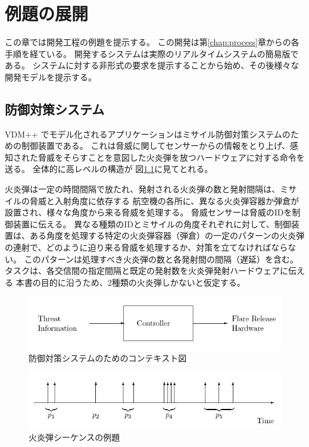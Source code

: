 \documentclass[\pformat,12pt]{jreport}
\begin{document}
\chapter{例題の展開}\label{chap:example}

この章では開発工程の例題を提示する。
この開発は第\ref{chap:process}章からの各手順を経ている。
開発するシステムは実際のリアルタイムシステムの簡易版である。
システムに対する非形式の要求を提示することから始め、その後様々な開発モデルを提示する。

\section{防御対策システム}\label{sec:CMdesc}

 VDM++ でモデル化されるアプリケーションはミサイル防御対策システムのための制御装置である。
これは脅威に関してセンサーからの情報をとり上げ、感知された脅威をそらすことを意図した火炎弾を放つハードウェアに対する命令を送る。
全体的に高レベルの構造が 図\ref{fig:contextdiag}に見てとれる。

火炎弾は一定の時間間隔で放たれ、発射される火炎弾の数と発射間隔は、ミサイルの脅威と入射角度に依存する
航空機の各所に、異なる火炎弾容器か弾倉が設置され、様々な角度から来る脅威を処理する。
脅威センサーは脅威のIDを制御装置に伝える。
異なる種類のIDとミサイルの角度それぞれに対して、制御装置は、ある角度を処理する特定の火炎弾容器（弾倉）の一定のパターンの火炎弾の連射で、どのように迫り来る脅威を処理するか、対策を立てなければならない。
このパターンは処理すべき火炎弾の数と各発射間の間隔（遅延）を含む。
タスクは、各交信間の指定間隔と既定の発射数を火炎弾発射ハードウェアに伝える
本書の目的に沿うため、2種類の火炎弾しかないと仮定する。

\begin{figure}
\begin{center}
\includegraphics[width=\textwidth]{contextdia}
\end{center}
\caption{防御対策システムのためのコンテキスト図}\label{fig:contextdiag}
\end{figure}

\begin{figure}
\begin{center}
\includegraphics[width=\textwidth]{flareseqs}
\end{center}
\caption{火炎弾シーケンスの例題}\label{fig:firing}
\end{figure}
\end{document}
